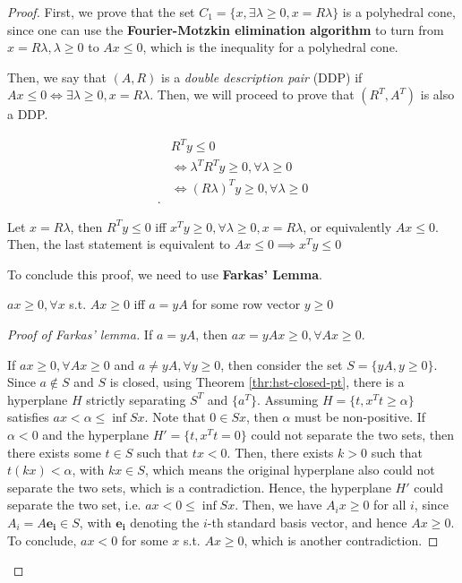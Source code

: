 \begin{proof}
  First, we prove that the set \( C_{1} = \{ x, \exists \lambda \ge 0, x =
  R\lambda\}   \) is a polyhedral cone, since one can use the
  \textbf{Fourier-Motzkin elimination algorithm} to turn from \( x = R\lambda,
  \lambda \ge 0 \) to \( Ax \le  0 \), which is the inequality for a polyhedral
  cone.

  Then, we say that \( (A, R) \) is a \textit{double description pair} (DDP) if
  \( Ax \le  0 \iff \exists \lambda \ge 0, x = R\lambda  \). Then, we will
  proceed to prove that \( (R^{T}, A^{T}) \) is also a DDP.

  \begin{align*}
    &R^{T}y \le 0\\
    &\iff \lambda^{T} R^{T} y \ge 0, \forall  \lambda \ge 0\\
    &\iff (R\lambda)^{T} y \ge 0, \forall  \lambda \ge 0\\
  .\end{align*}

  Let \( x = R\lambda \), then \( R^{T}y \le 0 \) iff \( x^{T}y \ge 0, \forall
  \lambda \ge 0, x = R\lambda \), or equivalently \( Ax \le  0 \). Then, the
  last statement is equivalent to \( Ax \le  0 \implies x^{T}y \le  0 \)

  To conclude this proof, we need to use \textbf{Farkas' Lemma}.

  \begin{lemma}
  \label{farkas}
    \( ax \ge  0, \forall  x \) s.t. \( Ax \ge  0 \) iff \( a = yA \) for some
    row vector \( y \ge  0 \)
  \end{lemma}

  \begin{proof}[Proof of Farkas' lemma]
    If \( a = yA \), then \( ax = yAx \ge  0, \forall  Ax \ge 0 \).

    If \( ax \ge  0, \forall Ax \ge 0 \) and \( a \neq  yA, \forall  y\ge 0 \),
    then consider the set \( S = \{yA, y \ge 0\}   \). Since \( a \notin S \)
    and \( S \) is closed, using Theorem \ref{thr:hst-closed-pt}, there is a
    hyperplane \( H \) strictly separating \( S^{T} \) and \( \{ a^{T}\}   \).
    Assuming \( H = \{t, x^{T}t \ge  \alpha\}   \) satisfies \( ax  <  \alpha
    \le   \inf Sx \). Note that \( 0 \in Sx \), then \( \alpha \) must be
    non-positive. If \( \alpha < 0 \) and the hyperplane \( H' = \{ t, x^{T}t =
    0\}   \) could not separate the two sets, then there exists some \( t \in S
    \) such that \( tx < 0 \). Then, there exists \( k > 0 \) such that \( t(kx)
    < \alpha\), with \( kx \in S \), which means the original hyperplane also could
    not separate the two sets, which is a contradiction. Hence, the hyperplane
    \( H' \) could separate the two set, i.e. \( ax < 0 \le \inf Sx \). Then,
    we have \( A_{i}x \ge  0 \) for all \( i \), since \( A_{i} =
    A\mathbf{e_{i}} \in S \), with \( \mathbf{e_{i}} \) denoting the \( i \)-th
    standard basis vector, and hence \( Ax \ge 0 \). To conclude, \( ax < 0 \)
    for some \( x \) s.t. \( Ax \ge 0 \), which is another contradiction.
  \end{proof}


\end{proof}
